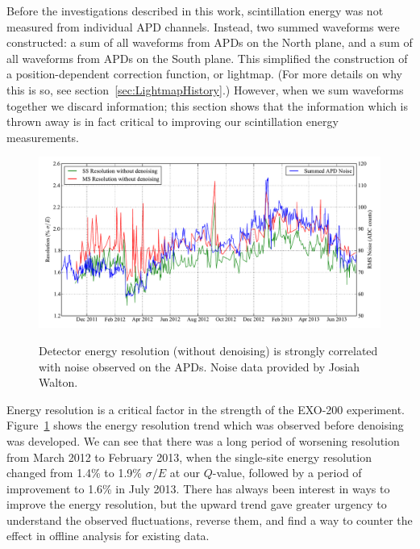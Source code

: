 Before the investigations described in this work, scintillation energy was not measured from individual APD channels.  Instead, two summed waveforms were constructed: a sum of all waveforms from APDs on the North plane, and a sum of all waveforms from APDs on the South plane.  This simplified the construction of a position-dependent correction function, or lightmap.  (For more details on why this is so, see section~\ref{sec:LightmapHistory}.)  However, when we sum waveforms together we discard information; this section shows that the information which is thrown away is in fact critical to improving our scintillation energy measurements.

\begin{figure}
\begin{center}
\includegraphics[keepaspectratio=true,width=\textwidth]{ResolutionAPDNoiseComparison.pdf}
\end{center}
\renewcommand{\baselinestretch}{1}
\small\normalsize
\begin{quote}
\caption{Detector energy resolution (without denoising) is strongly correlated with noise observed on the APDs.  Noise data provided by Josiah Walton.}
\label{fig:ResolutionAPDNoiseComparison}
\end{quote}
\end{figure}
\renewcommand{\baselinestretch}{2}
\small\normalsize

Energy resolution is a critical factor in the strength of the EXO-200 experiment.  Figure~\ref{fig:ResolutionAPDNoiseComparison} shows the energy resolution trend which was observed before denoising was developed.  We can see that there was a long period of worsening resolution from March 2012 to February 2013, when the single-site energy resolution changed from 1.4\% to 1.9\% $\sigma/E$ at our $Q$-value, followed by a period of improvement to 1.6\% in July 2013.  There has always been interest in ways to improve the energy resolution, but the upward trend gave greater urgency to understand the observed fluctuations, reverse them, and find a way to counter the effect in offline analysis for existing data.

